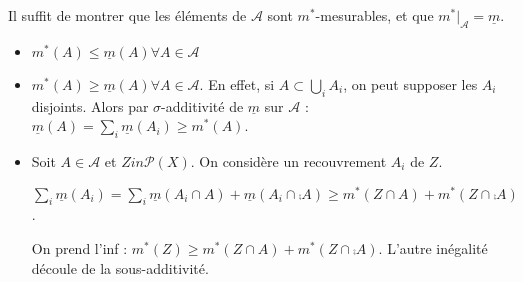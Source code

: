 \documentclass[10pt,a4paper,notitlepage ]{report}
\begin{document}
\begin{demo}
	
	Il suffit de montrer que les éléments de $\mathcal A$ sont $m^*$-mesurables, et que $m^*|_{\mathcal A} = \underline m$.
	\begin{itemize}
		\item $m^*(A) \le \underline m(A) \forall A \in \mathcal A$
		\item $m^*(A) \ge \underline m (A) \forall A \in \mathcal A$. En effet, si $A \subset \underset i \bigcup A_i$, on peut supposer les $A_i$ disjoints. Alors par $\sigma$-additivité de $\underline m$ sur $\mathcal A$ : $\underline m(A) = \underset i \sum \underline m(A_i) \ge m^*(A)$.
		\item Soit $A \in \mathcal A$ et $Zin \mathcal P(X)$. On considère un recouvrement $A_i$ de $Z$.
		
		$\underset i \sum \underline m(A_i) = \underset i \sum \underline m (A_i \cap A) + \underline m(A_i \cap \comp A) \ge m^*(Z \cap A) + m^*(Z \cap \comp A)$.
		
		On prend l'inf : $m^*(Z) \ge m^*(Z \cap A) + m^*(Z \cap \comp A)$. L'autre inégalité découle de la sous-additivité.
	\end{itemize}
\end{demo}
\end{document}
